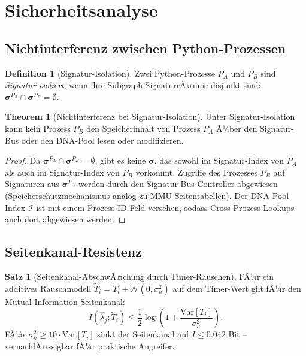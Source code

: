 ﻿\documentclass[a4paper,12pt]{article}
\theoremstyle{definition}
\newtheorem{definition}{Definition}[section]
\newtheorem{satz}{Satz}[section]
\newtheorem{theorem}{Theorem}[section]
\begin{document}
\section{Sicherheitsanalyse}

\subsection{Nichtinterferenz zwischen Python-Prozessen}

\begin{definition}[Signatur-Isolation]
  \label{def:isolation}
  Zwei Python-Prozesse $P_A$ und $P_B$ sind \emph{Signatur-isoliert},
  wenn ihre Subgraph-SignaturrÃ¤ume disjunkt sind:
  $\boldsymbol{\sigma}^{P_A} \cap \boldsymbol{\sigma}^{P_B} = \emptyset$.
\end{definition}

\begin{theorem}[Nichtinterferenz bei Signatur-Isolation]
  \label{thm:nichtinterferenz}
  Unter Signatur-Isolation kann kein Prozess $P_B$ den Speicherinhalt
  von Prozess $P_A$ Ã¼ber den Signatur-Bus oder den DNA-Pool lesen oder
  modifizieren.
\end{theorem}

\begin{proof}
  Da $\boldsymbol{\sigma}^{P_A} \cap \boldsymbol{\sigma}^{P_B} = \emptyset$,
  gibt es keine $\boldsymbol{\sigma}$, das sowohl im Signatur-Index von
  $P_A$ als auch im Signatur-Index von $P_B$ vorkommt.
  Zugriffe des Prozesses $P_B$ auf Signaturen aus $\boldsymbol{\sigma}^{P_A}$
  werden durch den Signatur-Bus-Controller abgewiesen
  (Speicherschutzmechanismus analog zu MMU-Seitentabellen).
  Der DNA-Pool-Index $\mathcal{I}$ ist mit einem Prozess-ID-Feld versehen,
  sodass Cross-Prozess-Lookups auch dort abgewiesen werden.
\end{proof}

\subsection{Seitenkanal-Resistenz}

\begin{satz}[Seitenkanal-AbschwÃ¤chung durch Timer-Rauschen]
  \label{satz:seitenkanal}
  FÃ¼r ein additives Rauschmodell $\tilde{T}_i = T_i + \mathcal{N}(0, \sigma_n^2)$
  auf dem Timer-Wert gilt fÃ¼r den Mutual Information-Seitenkanal:
  \begin{equation}
    I(\hat\lambda_j; \tilde{T}_i) \le \frac{1}{2}
    \log\!\left(1 + \frac{\mathrm{Var}[T_i]}{\sigma_n^2}\right).
  \end{equation}
  FÃ¼r $\sigma_n^2 \ge 10 \cdot \mathrm{Var}[T_i]$ sinkt der Seitenkanal
  auf $I \le 0.042$ Bit -- vernachlÃ¤ssigbar fÃ¼r praktische Angreifer.
\end{satz}
\end{document}
